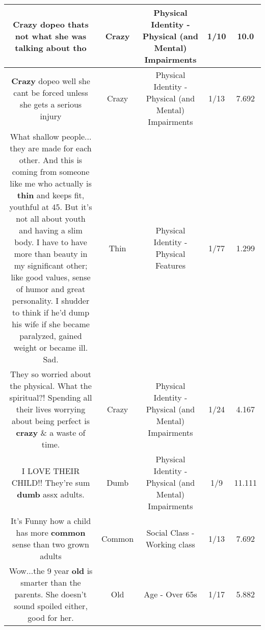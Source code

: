 \documentclass[11pt]{article}
\newlength\mylength
\begin{document}
\begin{center}
\begin{longtable}{|C{.65\mylength}|C{.30\mylength}|C{.12\mylength}|C{.12\mylength}|C{.12\mylength}|}
  \small \@\textbf{Crazy} dopeo thats  not what she was talking about tho\normalsize   & Crazy & Physical Identity - Physical (and Mental) Impairments & 1/10 & 10.0 \\  \hline
  \small \@\textbf{Crazy} dopeo well she cant be forced unless she gets a serious injury\normalsize   & Crazy & Physical Identity - Physical (and Mental) Impairments & 1/13 & 7.692 \\  \hline
  \small What shallow people... they are made for each other. And this is coming from someone like me who actually is \textbf{thin} and keeps fit, youthful at 45. But it's not all about youth and having a slim body. I have to have more than beauty in my significant other; like good values, sense of humor and great personality. I shudder to think if he'd dump his wife if she became paralyzed, gained weight or became ill. Sad.\normalsize   & Thin & Physical Identity - Physical Features & 1/77 & 1.299 \\  \hline
  \small They so worried about the physical. What the spiritual?! Spending all their lives worrying about being perfect is \textbf{crazy} \& a waste of time.\normalsize   & Crazy & Physical Identity - Physical (and Mental) Impairments & 1/24 & 4.167 \\  \hline
  \small I LOVE THEIR CHILD!! They're sum \textbf{dumb} assx adults.\normalsize   & Dumb & Physical Identity - Physical (and Mental) Impairments & 1/9 & 11.111 \\  \hline
  \small It's Funny how a child has more \textbf{common} sense than two grown adults\normalsize   & Common & Social Class - Working class & 1/13 & 7.692 \\  \hline
  \small Wow...the 9 year \textbf{old} is smarter than the parents. She doesn't sound spoiled either, good for her.\normalsize   & Old & Age - Over 65s & 1/17 & 5.882 \\  \hline

\end{longtable}
\end{center}
\end{document}
